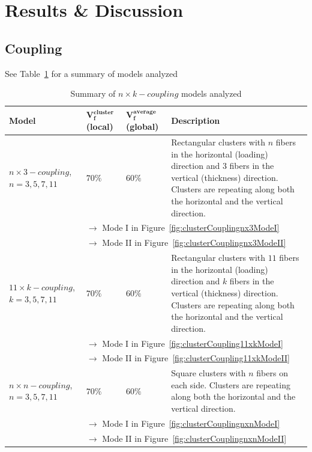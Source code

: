 \documentclass[review]{elsarticle}
\begin{document}
\section{Results \& Discussion}

\subsection{Coupling}\label{subsec:coupling}

See Table~\ref{table:coupling} for a summary of models analyzed

\begin{table}[!h]
\caption{Summary of $n\times k-coupling$ models analyzed}\label{table:coupling}
\begin{tabularx}{\textwidth}{p{}XXp{}}
\bf{Model}&$\mathbf{V_{f}^{cluster}}$ \bf{(local)}&$\mathbf{V_{f}^{average}}$ \bf{(global)}&\bf{Description}\\
\midrule
\toprule
$n\times 3-coupling$, $n=3,5,7,11$&$70\%$&$60\%$&Rectangular clusters with $n$ fibers in the horizontal (loading) direction and $3$ fibers in the vertical (thickness) direction. Clusters are repeating along both the horizontal and the vertical direction.\\
&\multicolumn{3}{l}{$\rightarrow$ Mode I in Figure~\ref{fig:clusterCouplingnx3ModeI}}\\
&\multicolumn{3}{l}{$\rightarrow$ Mode II in Figure~\ref{fig:clusterCouplingnx3ModeII}}\\
\midrule
$11\times k-coupling$, $k=3,5,7,11$&$70\%$&$60\%$&Rectangular clusters with $11$ fibers in the horizontal (loading) direction and $k$ fibers in the vertical (thickness) direction. Clusters are repeating along both the horizontal and the vertical direction.\\
&\multicolumn{3}{l}{$\rightarrow$ Mode I in Figure~\ref{fig:clusterCoupling11xkModeI}}\\
&\multicolumn{3}{l}{$\rightarrow$ Mode II in Figure~\ref{fig:clusterCoupling11xkModeII}}\\
\midrule
$n\times n-coupling$, $n=3,5,7,11$&$70\%$&$60\%$&Square clusters with $n$ fibers on each side. Clusters are repeating along both the horizontal and the vertical direction.\\
&\multicolumn{3}{l}{$\rightarrow$ Mode I in Figure~\ref{fig:clusterCouplingnxnModeI}}\\
&\multicolumn{3}{l}{$\rightarrow$ Mode II in Figure~\ref{fig:clusterCouplingnxnModeII}}\\
\midrule
\end{tabularx}
\end{table}
\end{document}
